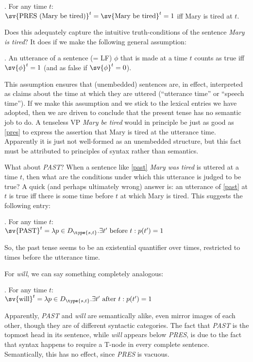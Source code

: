\ex. For any time $t$:\\
$\sv{\mbox{PRES (Mary be tired)}}^{t} = \sv{\mbox{Mary be tired}}^{t} = 1 $
iff Mary is tired at $t$.

Does this adequately capture the intuitive truth-conditions of the sentence \emph{Mary is tired}? It does if we make the following general assumption:

\ex. An utterance of a sentence (= LF) \ensuremath{\phi} that is made 
at a time $t$ counts as true iff $\sv{\ensuremath{\phi}}^{t} = 1$ (and as false 
if $\sv{\ensuremath{\phi}}^{t} =0$).

This assumption ensures that (unembedded) sentences are, in effect, interpreted as claims about the time at which they are uttered (``utterance time'' or ``speech time''). If we make this assumption and we stick to the lexical entries we have adopted, then we are driven to conclude that the present tense has no semantic job to do. A tenseless VP \emph{Mary be tired} would in principle be just as good as \ref{pres} to express the assertion that Mary is tired at the utterance time. Apparently it is just not well-formed as an unembedded structure, but this fact must be attributed to principles of syntax rather than semantics.

What about \emph{PAST}? When a sentence like \ref{past} \emph{Mary was tired} is uttered at a time $t$, then what are the conditions under which this utterance is judged to be true? A quick (and perhaps ultimately wrong) answer is: an utterance of \ref{past} at $t$ is true iff there is some time before $t$ at which Mary is tired. This suggests the following entry:

\ex. For any time $t$:\\
$\sv{\mbox{PAST}}^{t} = \ensuremath{\lambda}p\ensuremath{\in}D_{\type{s,t}}. \ensuremath{\exists}t'\mbox{ before }t: p(t') = 1$\label{ex:sempast}

So, the past tense seems to be an existential quantifier over times, restricted to times before the utterance time.

For \emph{will}, we can say something completely analogous:

\ex. For any time $t$:\\
$\sv{\mbox{will}}^{t} = \ensuremath{\lambda}p\ensuremath{\in}D_{\type{s,t}}. \ensuremath{\exists}t'\mbox{ after }t: p(t') = 1$\label{ex:semfut}

Apparently, \emph{PAST} and \emph{will} are semantically alike, even mirror images of each other, though they are of different syntactic categories. The fact that \emph{PAST} is the topmost head in its sentence, while \emph{will} appears below \emph{PRES}, is due to the fact that syntax happens to require a T-node in every complete sentence. Semantically, this has no effect, since \emph{PRES} is vacuous.

